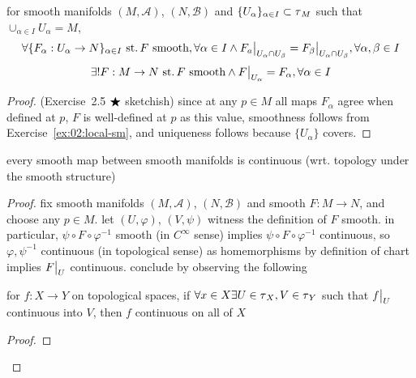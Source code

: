 \begin{lem}\label{lem:2.1}
  for smooth manifolds $(M,\mathscr A)$, $(N,\mathscr B)$ and
  $\{U_\alpha\}_{\alpha\in I}\subset\operatorname{\tau}_M$
  such that $\cup_{\alpha\in I} U_\alpha = M$,
  \[
  \forall\{F_\alpha:U_\alpha\rightarrow N\}_{\alpha\in I}
  \st F\text{ smooth}, \forall \alpha\in I \land
  \restr{F_a}{U_\alpha\cap U_\beta} = \restr{F_\beta}{U_\alpha\cap U_\beta},
  \forall \alpha, \beta\in I
  \]
  \[
  \exists! F:M\rightarrow N \st F\text{ smooth} \land
  \restr{F}{U_\alpha}=F_\alpha, \forall \alpha\in I
  \]
\end{lem}
\begin{proof}
  (Exercise~2.5 $\bigstar$ sketchish)
  since at any $p\in M$ all maps $F_\alpha$ agree when defined at $p$,
  $F$ is well-defined at $p$ as this value,
  smoothness follows from Exercise~\ref{ex:02:local-sm},
  and uniqueness follows because $\{U_\alpha\}$ covers.
\end{proof}

\begin{lem}\label{lem:2.2}\label{lem:02:cts-smooth}
  every smooth map between smooth manifolds is continuous
  (wrt. topology under the smooth structure)
\end{lem}
\begin{proof}
  fix smooth manifolds $(M,\mathscr A)$, $(N,\mathscr B)$ and
  smooth $F: M\rightarrow N$, and choose any $p\in M$.
  let $(U,\varphi)$, $(V,\psi)$ witness the definition of
  $F$ smooth.  in particular,
  $\psi\circ F\circ\varphi^{-1}$ smooth (in $C^\infty$ sense)
  implies $\psi\circ F\circ\varphi^{-1}$ continuous,
  so $\varphi, \psi^{-1}$ continuous (in topological sense)
  as homemorphisms by definition of chart implies
  $\restr{F}{U}$ continuous.
  conclude by observing the following
  \begin{fact}
    for $f: X\rightarrow Y$ on topological spaces,
    if $\forall x\in X\exists U\in\operatorname{\tau}_X, V\in\operatorname{\tau}_Y$
    such that $\restr{f}{U}$ continuous into $V$, then
    $f$ continuous on all of $X$
  \end{fact}
  \begin{proof}
  \end{proof}
\end{proof}

